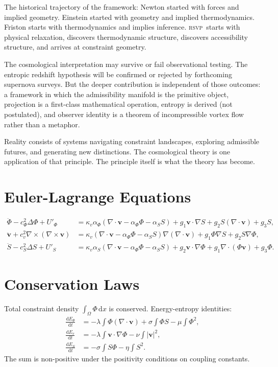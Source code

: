 \documentclass[12pt, oneside]{book}
\theoremstyle{plain}
\theoremstyle{definition}
\newcommand{\vfield}{\mathbf{v}}
\newcommand{\RSVP}{\textsc{rsvp}}
\newcommand{\dd}{\mathrm{d}}
\newcommand{\nab}{\nabla}
\begin{document}
The historical trajectory of the framework:
Newton started with forces and implied geometry.
Einstein started with geometry and implied thermodynamics.
Friston starts with thermodynamics and implies inference.
\RSVP\ starts with physical relaxation, discovers thermodynamic structure, discovers
accessibility structure, and arrives at constraint geometry.

The cosmological interpretation may survive or fail observational testing. The
entropic redshift hypothesis will be confirmed or rejected by forthcoming supernova
surveys. But the deeper contribution is independent of those outcomes: a framework
in which the admissibility manifold is the primitive object, projection is a
first-class mathematical operation, entropy is derived (not postulated), and observer
identity is a theorem of incompressible vortex flow rather than a metaphor.

Reality consists of systems navigating constraint landscapes, exploring admissible
futures, and generating new distinctions. The cosmological theory is one application
of that principle. The principle itself is what the theory has become.

\appendix

\chapter{Euler-Lagrange Equations}
\label{app:el}

\begin{align*}
\ddot{\Phi} - c_\Phi^2\Delta\Phi + U'_\Phi &=
  \kappa_v\alpha_\Phi(\nab\cdot\vfield - \alpha_\Phi\Phi - \alpha_S S)
  + g_1\vfield\cdot\nab S + g_2 S(\nab\cdot\vfield) + g_3 S,\\
\ddot{\vfield} + c_v^2\nab\times(\nab\times\vfield) &=
  \kappa_v(\nab\cdot\vfield - \alpha_\Phi\Phi - \alpha_S S)\nab(\nab\cdot\vfield)
  + g_1\Phi\nab S + g_2 S\nab\Phi,\\
\ddot{S} - c_S^2\Delta S + U'_S &=
  \kappa_v\alpha_S(\nab\cdot\vfield - \alpha_\Phi\Phi - \alpha_S S)
  + g_2\vfield\cdot\nab\Phi + g_1\nab\cdot(\Phi\vfield) + g_3\Phi.
\end{align*}

\chapter{Conservation Laws}
\label{app:conservation}

Total constraint density $\int_\Omega\Phi\, \dd x$ is conserved. Energy-entropy
identities:
\begin{align*}
\tfrac{\dd E_\Phi}{\dd t} &= -\lambda\textstyle\int\Phi(\nab\cdot\vfield)
  +\sigma\int\Phi S - \mu\int\Phi^2,\\
\tfrac{\dd E_v}{\dd t} &= -\lambda\int\vfield\cdot\nab\Phi - \nu\int|\vfield|^2,\\
\tfrac{\dd E_S}{\dd t} &= -\sigma\int S\Phi - \eta\int S^2.
\end{align*}
The sum is non-positive under the positivity conditions on coupling constants.
\end{document}
